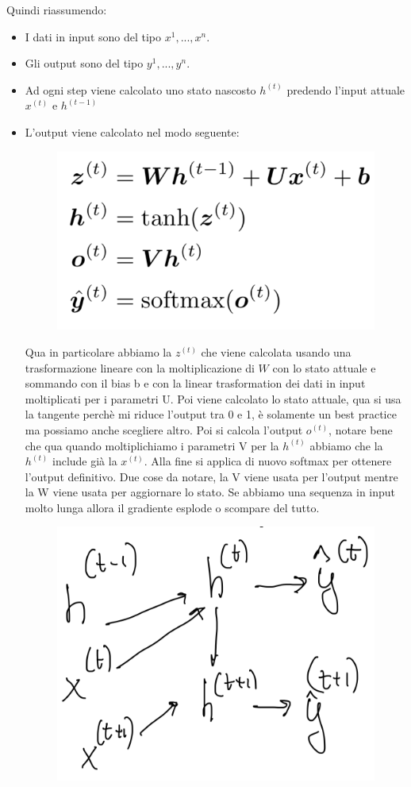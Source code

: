\documentclass[14pt]{extreport}
\begin{document}
Quindi riassumendo:

\begin{itemize}
	\item I dati in input sono del tipo $x^{1},...,x^{n}$.
	\item Gli output sono del tipo $y^{1},..., y^{n}$.
	\item Ad ogni step viene calcolato uno stato nascosto $h^{(t)}$ predendo l'input attuale $x^{(t)}$ e $h^{(t-1)}$
	\item L'output viene calcolato nel modo seguente:
	\begin{figure}[H]
		\centering
		\includegraphics[width=0.7\linewidth]{417.jpeg}
		\end{figure}
	Qua in particolare abbiamo la $z^{(t)}$ che viene calcolata usando una trasformazione lineare con la moltiplicazione di $W$ con lo stato attuale e sommando con il bias b e con la linear trasformation dei dati in input moltiplicati per i parametri U.
	Poi viene calcolato lo stato attuale, qua si usa la tangente perchè mi riduce l'output tra 0 e 1, è solamente un best practice ma possiamo anche scegliere altro.
	Poi si calcola l'output $o^{(t)}$, notare bene che qua quando moltiplichiamo i parametri V per la $h^{(t)}$ abbiamo che la $h^{(t)}$ include già la $x^{(t)}$.
	Alla fine si applica di nuovo softmax per ottenere l'output definitivo.
	Due cose da notare, la V viene usata per l'output mentre la W viene usata per aggiornare lo stato.
	Se abbiamo una sequenza in input molto lunga allora il gradiente esplode o scompare del tutto.
	\begin{figure}[H]
	\centering
	\includegraphics[width=0.7\linewidth]{418.jpeg}
	\end{figure}
\end{itemize}
\end{document}
